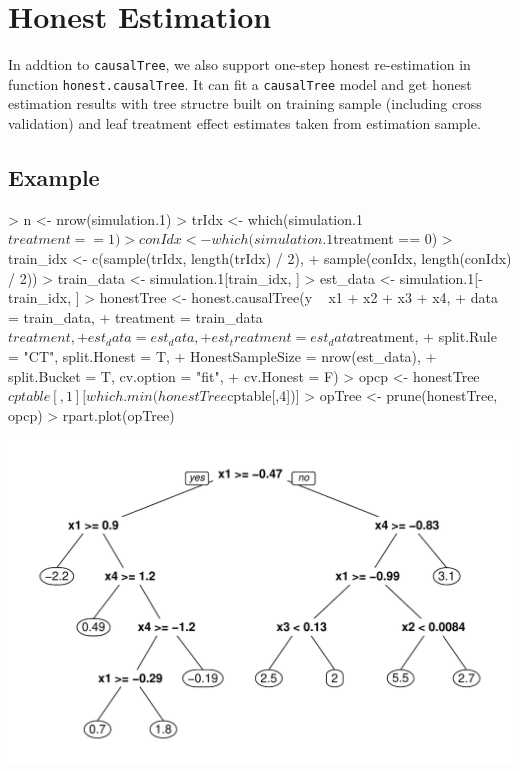\documentclass[11pt]{article}
\renewenvironment{Schunk}{\vspace{\topsep}}{\vspace{\topsep}}
\begin{document}
\section{Honest Estimation}
In addtion to \texttt{causalTree}, we also support one-step honest re-estimation in function \texttt{honest.causalTree}. It can fit a \texttt{causalTree} model and get honest estimation results with tree structre built on training sample (including cross validation) and leaf treatment effect estimates taken from estimation sample.

\subsection{Example}
\begin{Schunk}
\begin{Sinput}
> n <- nrow(simulation.1)
> trIdx <- which(simulation.1$treatment == 1)
> conIdx <- which(simulation.1$treatment == 0)
> train_idx <- c(sample(trIdx, length(trIdx) / 2),
+                sample(conIdx, length(conIdx) / 2))
> train_data <- simulation.1[train_idx, ]
> est_data <- simulation.1[-train_idx, ]
> honestTree <- honest.causalTree(y ~ x1 + x2 + x3 + x4,
+                       data = train_data,
+                       treatment = train_data$treatment,
+                       est_data = est_data,
+                       est_treatment = est_data$treatment,
+                       split.Rule = "CT", split.Honest = T,
+                       HonestSampleSize = nrow(est_data),
+                       split.Bucket = T, cv.option = "fit",
+                       cv.Honest = F)
> opcp <-  honestTree$cptable[,1][which.min(honestTree$cptable[,4])]
> opTree <- prune(honestTree, opcp)
> rpart.plot(opTree)
\end{Sinput}
\end{Schunk}
\includegraphics{briefintro-example3}
\end{document}

